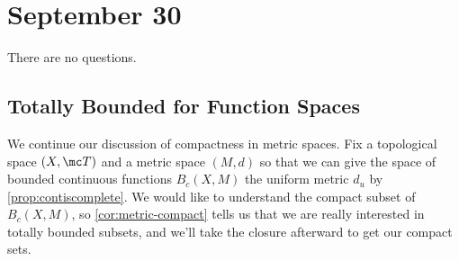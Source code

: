 \documentclass[../notes.tex]{subfiles}
\begin{document}
\section{September 30}

There are no questions.

\subsection{Totally Bounded for Function Spaces}
We continue our discussion of compactness in metric spaces. Fix a topological space $(X,\mc T)$ and a metric space $(M,d)$ so that we can give the space of bounded continuous functions $B_c(X,M)$ the uniform metric $d_u$ by \autoref{prop:contiscomplete}. We would like to understand the compact subset of $B_c(X,M)$, so \autoref{cor:metric-compact} tells us that we are really interested in totally bounded subsets, and we'll take the closure afterward to get our compact sets.
\end{document}
